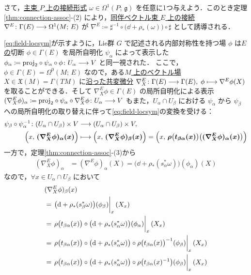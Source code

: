 \documentclass[TQFT_main]{subfiles}
\begin{document}
さて，\underline{主束 $P$ 上の}\hyperref[def:connection]{接続形式} $\omega \in \Omega^1(P;\, \mathfrak{g})$ を任意に1つ与えよう．このとき定理\ref{thm:connection-assoc}-(2) により，\underline{同伴ベクトル束 $E$ 上の}\hyperref[def:connection-vect]{接続} $\nabla^E \colon \Gamma(E) \longrightarrow \Omega^1(M;\, E)$ が $\nabla^E \coloneqq \sharp^{-1}\circ \bigl(\dd + \rho_* (\omega)\bigr) \circ \sharp$ として誘導される．

\eqref{eq:field-locsym}が示すように，Lie群 $G$ で記述される内部対称性を持つ場 $\phi$ は\underline{$E$ の}切断 $\phi \in \Gamma(E)$ を局所自明化 $\psi_\alpha$ によって表示した $\phi_\alpha \coloneqq \mathrm{proj}_2 \circ \psi_\alpha \circ \phi \colon U_\alpha \longrightarrow V$ と同一視された．
ここで，$\phi \in \Gamma(E) = \Omega^0 (M;\, E)$ なので，ある\underline{$M$ 上の}\hyperref[def:vecf]{ベクトル場} $X \in \mathfrak{X}(M) = \Gamma(TM)$ に\hyperref[def:connection-vect]{沿った共変微分} $\nabla_X^E \colon \Gamma(E) \longrightarrow \Gamma(E),\; \phi \longmapsto \nabla^E\phi(X)$ を取ることができる．そして $\nabla^E_X \phi \in \Gamma (E)$ の局所自明化による表示 $(\nabla^E_X \phi)_\alpha \coloneqq \mathrm{proj}_2 \circ \psi_\alpha \circ \nabla^E_X \phi \colon U_\alpha \longrightarrow V$ もまた，$U_\alpha \cap U_\beta$ における $\psi_\alpha$ から $\psi_\beta$ への局所自明化の取り替えに伴って\eqref{eq:field-locsym}の変換を受ける：
\begin{align}
    \psi_\beta \circ \psi_\alpha^{-1} \colon (U_\alpha \cap U_\beta) \times V &\longrightarrow (U_\alpha \cap U_\beta) \times V, \\
    \Bigl( x,\, \bm{(\nabla_X^E\phi)_\alpha (x)} \Bigr) &\longmapsto \Bigl( x,\, \bm{(\nabla_X^E\phi)_\beta (x)}  \Bigr) = \Bigl( x,\, \bm{\rho\bigl(t_{\beta\alpha}(x)\bigr) \bigl( (\nabla_X^E\phi)_\alpha (x)\bigr)}  \Bigr) 
\end{align}
一方で，定理\ref{thm:connection-assoc}-(3)から
\begin{align}
    (\nabla_X^E\phi)_\alpha
    &= (\nabla^E\phi)_\alpha(X)
    = \bigl( \dd + \rho_* (s^*_\alpha \omega) \bigr)( \phi_\alpha ) (X)
\end{align}
なので，$\forall x \in U_\alpha \cap U_\beta$ において
\begin{align}
    &(\nabla_X^E\phi)_\beta (x) \\
    &= \eval{\bigl( \dd + \rho_* (s^*_\beta \omega) \bigr) ( \phi_\beta )}_x (X_x) \\
    &= \eval{\rho \bigl( t_{\beta\alpha}(x) \bigr) \circ \bigl( \dd + \rho_* (s^*_\alpha \omega) \bigr) ( \phi_\alpha )}_x (X_x) \\
    &= \eval{\rho \bigl( t_{\beta\alpha}(x) \bigr) \circ \bigl( \dd + \rho_* (s^*_\alpha \omega) \bigr) \circ \rho\bigl(t_{\beta\alpha}(x)\bigr)^{-1} (\phi_\beta)}_x (X_x) \\
    &= \eval{\rho \bigl( t_{\beta\alpha}(x) \bigr) \circ \bigl( \dd + \rho_* (s^*_\alpha \omega) \bigr) \circ \rho\bigl(t_{\beta\alpha}(x)^{-1}\bigr) (\phi_\beta)}_x (X_x)
\end{align}
\end{document}
